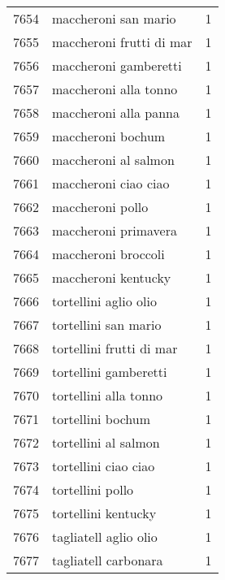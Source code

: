 \begin{tabular}{llr}
7654 &                               maccheroni san mario &      1 \\
7655 &                           maccheroni frutti di mar &      1 \\
7656 &                              maccheroni gamberetti &      1 \\
7657 &                              maccheroni alla tonno &      1 \\
7658 &                              maccheroni alla panna &      1 \\
7659 &                                  maccheroni bochum &      1 \\
7660 &                               maccheroni al salmon &      1 \\
7661 &                               maccheroni ciao ciao &      1 \\
7662 &                                   maccheroni pollo &      1 \\
7663 &                               maccheroni primavera &      1 \\
7664 &                                maccheroni broccoli &      1 \\
7665 &                                maccheroni kentucky &      1 \\
7666 &                              tortellini aglio olio &      1 \\
7667 &                               tortellini san mario &      1 \\
7668 &                           tortellini frutti di mar &      1 \\
7669 &                              tortellini gamberetti &      1 \\
7670 &                              tortellini alla tonno &      1 \\
7671 &                                  tortellini bochum &      1 \\
7672 &                               tortellini al salmon &      1 \\
7673 &                               tortellini ciao ciao &      1 \\
7674 &                                   tortellini pollo &      1 \\
7675 &                                tortellini kentucky &      1 \\
7676 &                              tagliatell aglio olio &      1 \\
7677 &                               tagliatell carbonara &      1 \\

\end{tabular}
